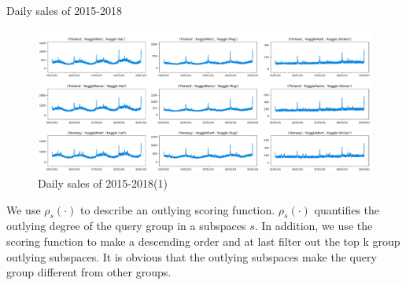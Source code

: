 \documentclass[
 size=14pt,
 paper=smartboard,  %
 mode=present, 		%
 display=slides, 	%
 style=tuliplab,  	%
 pauseslide,
 fleqn,leqno]{powerdot}
\begin{document}
\begin{slide}{Daily sales of 2015-2018}
\begin{figure}     
\centering     
\includegraphics[totalheight=2.8in]{03.eps}     
\caption{Daily sales of 2015-2018(1)}     
\end{figure}
\begin{note}
We use $\rho_s(\cdot)$ to describe an outlying scoring function.
$\rho_s(\cdot)$ quantifies the outlying degree of the query group in a subspaces $s$.
In addition,
we use the scoring function to make a descending order and at last
filter out the top k group outlying subspaces.
It is obvious that the outlying subspaces make the
query group different from other groups.
\end{note}

\end{slide}
\end{document}
